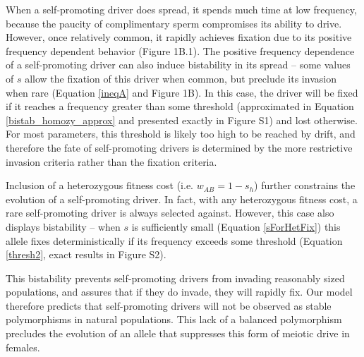 \documentclass{pnastwo}
\begin{document}
\begin{article}
When a self-promoting driver does spread, 
	it spends much time at low frequency, 
	because the paucity of complimentary sperm compromises its ability to drive. 
However, once relatively common, it  rapidly achieves fixation due to its
	positive frequency dependent behavior (Figure 1B.1).  
The positive frequency dependence of a self-promoting driver can also
	induce bistability in its spread -- some values of $s$ 
	allow the fixation of this driver when common, but 
	preclude its invasion when rare (Equation \ref{ineqA} and Figure 1B). 
In this case, the driver will be fixed if it reaches a frequency greater than some threshold 
	(approximated in Equation \ref{bistab_homozy_approx} and  presented exactly in 
	Figure S1) and lost otherwise. 
For most parameters, this threshold is likely too high to be reached by drift, 
	and therefore  the fate of self-promoting drivers is determined
	by the more restrictive invasion criteria rather than the fixation criteria. 

Inclusion of a heterozygous fitness cost (i.e. $w_{AB}=1-s_h$)
	further constrains the evolution of a self-promoting driver. 
In fact, with any heterozygous fitness cost, a rare self-promoting
	driver is always selected against. 
However, this case also displays bistability -- 
	when $s$ is sufficiently small (Equation \ref{sForHetFix}) this allele fixes deterministically if its 
	frequency exceeds some threshold  (Equation \ref{thresh2}, exact results in 
	Figure S2).

This bistability prevents self-promoting drivers from invading 	
	reasonably sized populations, and assures that if they do invade, they will rapidly fix.
Our model therefore predicts that self-promoting drivers will not be
	observed as stable polymorphisms in natural populations. 
This lack of a balanced polymorphism
	precludes the evolution of an
	allele that suppresses this form of meiotic drive in females.


\end{article}
\end{document}
